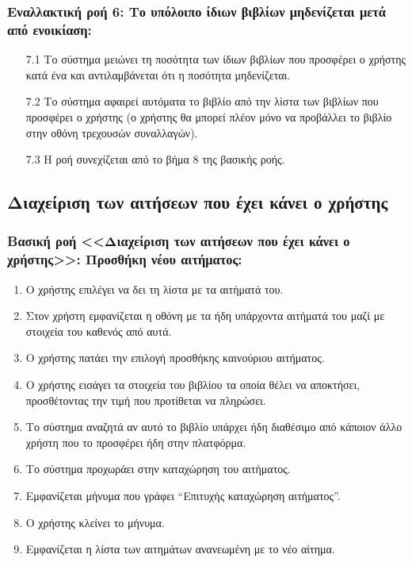 \documentclass[12pt,a4paper]{article}
\begin{document}
\subsubsection*{Εναλλακτική ροή 6: Το υπόλοιπο ίδιων βιβλίων μηδενίζεται μετά από ενοικίαση:}
\begin{enumerate}
    \item [7.1] Το σύστημα μειώνει τη ποσότητα των ίδιων βιβλίων που προσφέρει ο χρήστης κατά ένα και αντιλαμβάνεται ότι η ποσότητα μηδενίζεται.
    \item [7.2] Το σύστημα αφαιρεί αυτόματα το βιβλίο από την λίστα των βιβλίων που προσφέρει ο χρήστης (ο χρήστης θα μπορεί πλέον μόνο να προβάλλει το βιβλίο στην οθόνη τρεχουσών συναλλαγών).
    \item [7.3] Η ροή συνεχίζεται από το βήμα 8 της βασικής ροής.
\end{enumerate}

\subsection{Διαχείριση των αιτήσεων που έχει κάνει ο χρήστης}

\subsubsection*{Βασική ροή <<Διαχείριση των αιτήσεων που έχει κάνει ο χρήστης>>: Προσθήκη νέου αιτήματος:}
\begin{enumerate}
    \item Ο χρήστης επιλέγει να δει τη λίστα με τα αιτήματά του.
    \item Στον χρήστη εμφανίζεται η οθόνη με τα ήδη υπάρχοντα αιτήματά του μαζί με στοιχεία του καθενός από αυτά.
    \item Ο χρήστης πατάει την επιλογή προσθήκης καινούριου αιτήματος.
    \item Ο χρήστης εισάγει τα στοιχεία του βιβλίου τα οποία θέλει να αποκτήσει, προσθέτοντας την τιμή που προτίθεται να πληρώσει.
    \item Το σύστημα αναζητά αν αυτό το βιβλίο υπάρχει ήδη διαθέσιμο από κάποιον άλλο χρήστη που το προσφέρει ήδη στην πλατφόρμα.
    \item Το σύστημα προχωράει στην καταχώρηση του αιτήματος.
    \item Εμφανίζεται μήνυμα που γράφει “Επιτυχής καταχώρηση αιτήματος”.
    \item Ο χρήστης κλείνει το μήνυμα.
    \item Εμφανίζεται η λίστα των αιτημάτων ανανεωμένη με το νέο αίτημα.
\end{enumerate}
\end{document}

